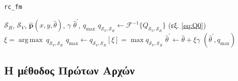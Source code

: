 \begin{algorithm}
  \caption{\texttt{rc\_fm}}
  \begin{spacing}{1.3}
  \begin{algorithmic}[1]
    \REQUIRE $\mathcal{S}_R$, $\mathcal{S}_V$, $\hat{\bm{p}}(x, y, \hat{\theta})$, $\gamma$
    \ENSURE $\hat{\theta}^\prime$, $q_{\max}$
    \STATE $q_{\mathcal{S}_V, \mathcal{S}_R} \leftarrow \mathcal{F}^{-1}\{Q_{\mathcal{S}_V, \mathcal{S}_R}\}$ (εξ. \ref{eq:Q0})
    \STATE $\xi = \operatorname*{arg\,max} \ q_{\mathcal{S}_V, \mathcal{S}_R}$
    \STATE $q_{\max} \leftarrow q_{\mathcal{S}_V, \mathcal{S}_R}[\xi] = \max q_{\mathcal{S}_V, \mathcal{S}_R}$
    \STATE $\hat{\theta}^\prime \leftarrow \hat{\theta} + \xi \gamma$
    \RETURN $(\hat{\theta}^\prime, q_{\max})$
  \end{algorithmic}
  \end{spacing}
  \label{alg:algorithm_fmrc}
\end{algorithm}


\subsection{Η μέθοδος Πρώτων Αρχών}
\label{subsection:02_04_02:02}

